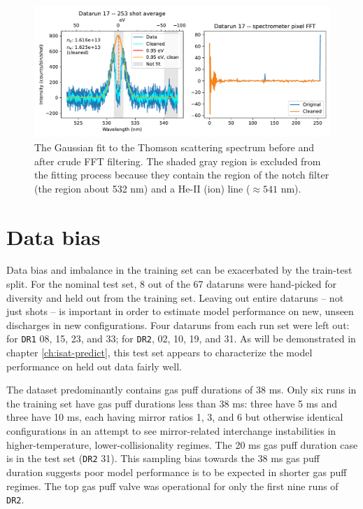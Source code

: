 \begin{figure}
	\centering
	\includegraphics[width=\linewidth]{figures/TS_fit-and-FFT.pdf}
	\caption[Cleaning Thomson scattering spectra]{\label{fig:TS_fit-and-FFT} The Gaussian fit to the Thomson scattering spectrum before and after crude FFT filtering. The shaded gray region is excluded from the fitting process because they contain the region of the notch filter (the region about 532 nm) and a He-II (ion) line ($\approx 541$ nm).}
\end{figure}


\section{Data bias \label{sec:app_bias}}

Data bias and imbalance in the training set can be exacerbated by the train-test split. For the nominal test set, 8 out of the 67 dataruns were hand-picked for diversity and held out from the training set. Leaving out entire dataruns -- not just shots -- is important in order to estimate model performance on new, unseen discharges in new configurations. Four dataruns from each run set were left out: for \texttt{DR1} 08, 15, 23, and 33; for \texttt{DR2}, 02, 10, 19, and 31. As will be demonstrated in chapter \ref{ch:isat-predict}, this test set appears to characterize the model performance on held out data fairly well.

The dataset predominantly contains gas puff durations of 38 ms. Only six runs in the training set have gas puff durations less than 38 ms: three have 5 ms and three have 10 ms, each having mirror ratios 1, 3, and 6 but otherwise identical configurations in an attempt to see mirror-related interchange instabilities in higher-temperature, lower-collisionality regimes. The 20 ms gas puff duration case is in the test set (\texttt{DR2} 31). This sampling bias towards the 38 ms gas puff duration suggests poor model performance is to be expected in shorter gas puff regimes. The top gas puff valve was operational for only the first nine runs of \texttt{DR2}.

